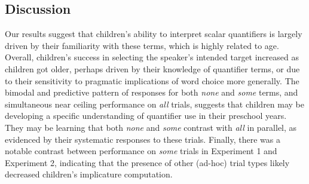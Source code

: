\documentclass[10pt,letterpaper]{article}
\begin{document}

\subsection{Discussion}

Our results suggest that children's ability to interpret scalar quantifiers is largely driven by their familiarity with these terms, which is highly related to age. Overall, children's success in selecting the speaker's intended target increased as children got older, perhaps driven by their knowledge of quantifier terms, or due to their sensitivity to pragmatic implications of word choice more generally. The bimodal and predictive pattern of responses for both \emph{none} and \emph{some} terms, and simultaneous near ceiling performance on \emph{all} trials, suggests that children may be developing a specific understanding of quantifier use in their preschool years. They may be learning that both \emph{none} and \emph{some} contrast with \emph{all} in parallel, as evidenced by their systematic responses to these trials. Finally, there was a notable contrast between performance on \emph{some} trials in Experiment 1 and Experiment 2, indicating that the presence of other (ad-hoc) trial types likely decreased children's implicature computation. 

\end{document}
